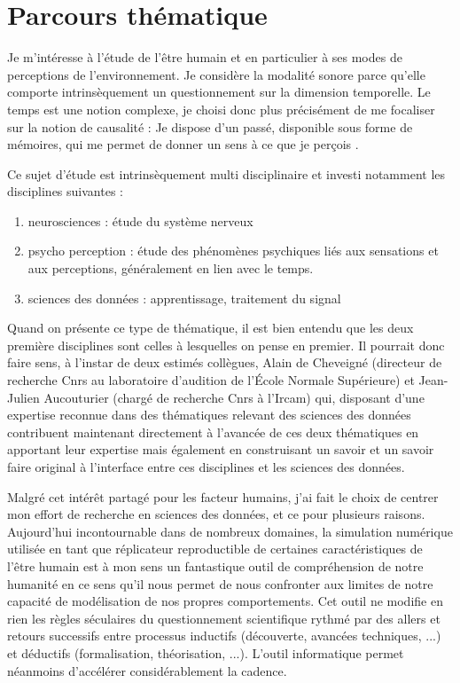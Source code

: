 \chapter{Parcours thématique} \label{sec:themes}

Je m'intéresse à l'étude de l'être humain et en particulier à ses modes de perceptions de l'environnement. Je considère la modalité sonore parce qu'elle comporte intrinsèquement un questionnement sur la dimension temporelle. Le temps est une notion complexe, je choisi donc plus précisément de me focaliser sur la notion de causalité : \og Je dispose d'un passé, disponible sous forme de mémoires, qui me permet de donner un sens à ce que je perçois \fg.

Ce sujet d'étude est intrinsèquement multi disciplinaire et investi notamment les disciplines suivantes :
\begin{enumerate}
  \item neurosciences : étude du système nerveux
  \item psycho perception : étude des phénomènes psychiques liés aux sensations et aux perceptions, généralement en lien avec le temps.
  \item sciences des données : apprentissage, traitement du signal
\end{enumerate}

Quand on présente ce type de thématique, il est bien entendu que les deux première disciplines sont  celles à lesquelles on pense en premier. Il pourrait donc faire sens, à l'instar de deux estimés collègues, Alain de Cheveigné (directeur de recherche Cnrs au laboratoire d'audition de l'\'Ecole Normale Supérieure) et Jean-Julien Aucouturier (chargé de recherche Cnrs à l'Ircam) qui, disposant d'une expertise reconnue dans des thématiques relevant des sciences des données contribuent maintenant directement à l'avancée de ces deux thématiques en apportant leur expertise mais également en construisant un savoir et un savoir faire original à l'interface entre ces disciplines et les sciences des données.

Malgré cet intérêt partagé pour les facteur humains, j'ai fait le choix de centrer mon effort de recherche en sciences des données, et ce pour plusieurs raisons. Aujourd'hui incontournable dans de nombreux domaines, la simulation numérique utilisée en tant que \og réplicateur reproductible \fg de certaines caractéristiques de l'être humain est à mon sens un fantastique outil de compréhension de notre humanité en ce sens qu'il nous permet de nous confronter aux limites de notre capacité de modélisation de nos propres comportements. Cet outil ne modifie en rien les règles séculaires du questionnement scientifique rythmé par des allers et retours successifs entre processus inductifs (découverte, avancées techniques, ...) et déductifs (formalisation, théorisation, ...). L'outil informatique permet néanmoins d'accélérer considérablement la cadence.

